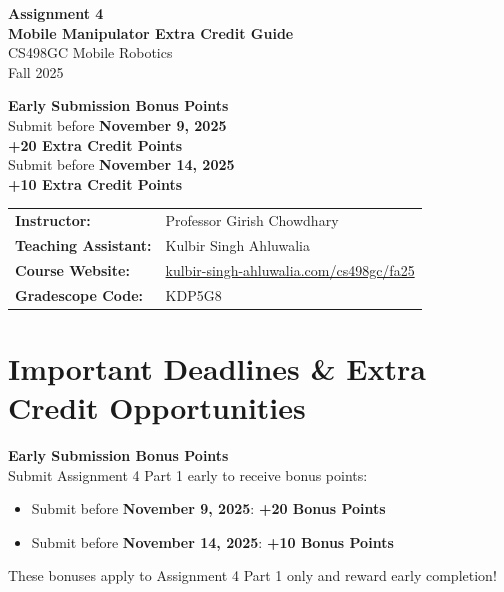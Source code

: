 \documentclass[11pt,a4paper]{article}
\begin{document}
\begin{center}
    \vspace*{2cm}
    {\Huge \textcolor{uiucblue}{\textbf{Assignment 4}}}\\[0.5cm]
    {\LARGE \textcolor{uiucorange}{\textbf{Mobile Manipulator Extra Credit Guide}}}\\[1cm]
    {\Large CS498GC Mobile Robotics}\\[0.5cm]
    {\large Fall 2025}\\[2cm]

    \begin{tcolorbox}[
        colback=green!10,
        colframe=successgreen,
        width=0.8\textwidth,
        arc=3mm,
        boxrule=2pt
    ]
        \centering
        \Large \textbf{Early Submission Bonus Points}\\[0.3cm]
        \large Submit before \textbf{November 9, 2025}\\
        \Large \textcolor{successgreen}{\textbf{+20 Extra Credit Points}}\\[0.2cm]
        \large Submit before \textbf{November 14, 2025}\\
        \Large \textcolor{successgreen}{\textbf{+10 Extra Credit Points}}
    \end{tcolorbox}

    \vspace{2cm}

    \begin{tabular}{ll}
        \textbf{Instructor:} & Professor Girish Chowdhary\\
        \textbf{Teaching Assistant:} & Kulbir Singh Ahluwalia\\
        \textbf{Course Website:} & \href{https://kulbir-singh-ahluwalia.com/cs498gc/fa25/}{kulbir-singh-ahluwalia.com/cs498gc/fa25}\\
        \textbf{Gradescope Code:} & KDP5G8
    \end{tabular}
\end{center}

\newpage
\tableofcontents
\newpage

\section{Important Deadlines \& Extra Credit Opportunities}

\begin{successbox}
\textbf{Early Submission Bonus Points} \faRocket\\[0.3cm]
Submit Assignment 4 Part 1 early to receive bonus points:\\[0.2cm]
\begin{itemize}[nosep]
    \item Submit before \textbf{November 9, 2025}: \textcolor{successgreen}{\textbf{+20 Bonus Points}}
    \item Submit before \textbf{November 14, 2025}: \textcolor{successgreen}{\textbf{+10 Bonus Points}}
\end{itemize}
These bonuses apply to Assignment 4 Part 1 only and reward early completion!
\end{successbox}
\end{document}
